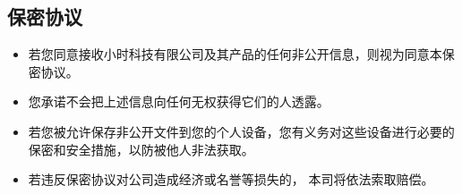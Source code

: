 
\subsection{保密协议}
\begin{itemize}
\item 若您同意接收小时科技有限公司及其产品的任何非公开信息，则视为同意本保密协议。
\item 您承诺不会把上述信息向任何无权获得它们的人透露。
\item 若您被允许保存非公开文件到您的个人设备，您有义务对这些设备进行必要的保密和安全措施，以防被他人非法获取。
\item 若违反保密协议对公司造成经济或名誉等损失的， 本司将依法索取赔偿。
\end{itemize}
